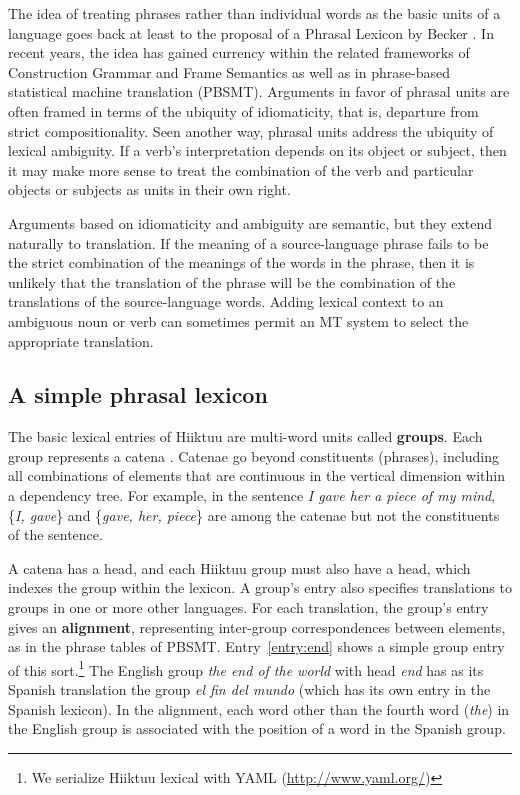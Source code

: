 \documentclass[11pt, a4paper]{article}
\begin{document}
The idea of treating phrases rather than individual words as the basic units of a language
goes back at least to the proposal of a Phrasal Lexicon by Becker .
In recent years, the idea has gained currency within the related frameworks of Construction Grammar \cite{steels}
and Frame Semantics \cite{fillmoreFS} as well as in phrase-based statistical machine translation (PBSMT).
Arguments in favor of phrasal units are often framed in terms of the ubiquity of idiomaticity, that is, departure
from strict compositionality.
Seen another way, phrasal units address the ubiquity of lexical ambiguity.
If a verb's interpretation depends on its object or subject, then it may make more sense to treat the combination
of the verb and particular objects or subjects as units in their own right.

Arguments based on idiomaticity and ambiguity are semantic, but they extend naturally to translation.
If the meaning of a source-language phrase fails to be the strict combination of the meanings
of the words in the phrase, then it is unlikely that the translation of the phrase will be the
combination of the translations of the source-language words.
Adding lexical context to an ambiguous noun or verb can sometimes permit an MT
system to select the appropriate translation.

\subsection{A simple phrasal lexicon}
\label{subsect:lexicon}

The basic lexical entries of Hiiktuu are multi-word units called \textbf{groups}.
Each group represents a catena \cite{osborneetal12}.
Catenae go beyond constituents (phrases), including all combinations of elements that are continuous
in the vertical dimension within a dependency tree.
For example, in the sentence \textit{I gave her a piece of my mind}, \{\textit{I, gave}\} and \{\textit{gave, her, piece}\}
are among the catenae but not the constituents of the sentence.

A catena has a head, and each Hiiktuu group must also have a head, which indexes the group within the lexicon.
A group's entry also specifies translations to groups in one or more other languages.
For each translation, the group's entry gives an \textbf{alignment}, representing inter-group correspondences between
elements, as in the phrase tables of PBSMT.
Entry~\ref{entry:end} shows a simple group entry of
this sort.\footnote{We serialize Hiiktuu lexical with YAML (\url{http://www.yaml.org/})}
The English group \textit{the end of the world} with head \textit{end} has as its Spanish translation
the group \textit{el fin del mundo} (which has its own entry in the Spanish lexicon).
In the alignment, each word other than the fourth word (\textit{the}) in the English group is associated with the position
of a word in the Spanish group.
\end{document}

